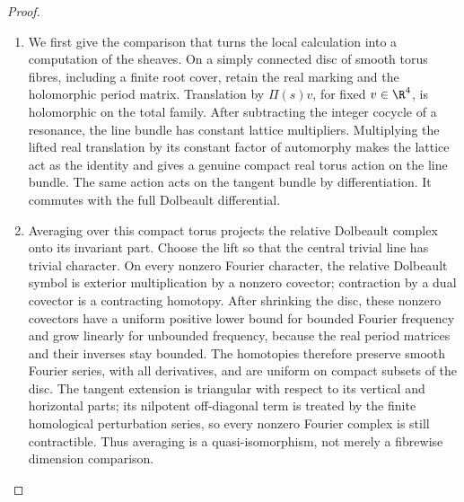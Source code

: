 \begin{proof}
\begin{enumerate}[label=\arabic*.,leftmargin=*]
\item We first give the comparison that turns the local calculation into
a computation of the sheaves. On a simply connected disc of smooth
torus fibres, including a finite root cover, retain the real marking
and the holomorphic period matrix. Translation by $\Pi(s)v$, for
fixed $v\in\R^4$, is holomorphic on the total family. After
subtracting the integer cocycle of a resonance, the line bundle has
constant lattice multipliers. Multiplying the lifted real translation
by its constant factor of automorphy makes the lattice act as the
identity and gives a genuine compact real torus action on the line
bundle. The same action acts on the tangent bundle by differentiation.
It commutes with the full Dolbeault differential.

\item Averaging over this compact torus projects the relative Dolbeault
complex onto its invariant part. Choose the lift so that the central
trivial line has trivial character. On every nonzero Fourier character,
the relative Dolbeault symbol is exterior multiplication by a
nonzero covector; contraction by a dual covector is a contracting
homotopy. After shrinking the disc, these nonzero covectors have a
uniform positive lower bound for bounded Fourier frequency and grow
linearly for unbounded frequency, because the real period matrices
and their inverses stay bounded. The homotopies therefore preserve
smooth Fourier series, with all derivatives, and are uniform on
compact subsets of the disc. The tangent extension is triangular
with respect to its vertical and horizontal parts; its nilpotent
off-diagonal term is treated by the finite homological perturbation
series, so every nonzero Fourier complex is still contractible.
Thus averaging is a quasi-isomorphism, not merely a fibrewise
dimension comparison.


\end{enumerate}
\end{proof}
